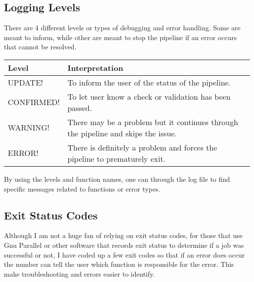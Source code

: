 \documentclass[letterpaper,10pt,english]{sphinxmanual}
\begin{document}
\subsection{Logging Levels}
\label{\detokenize{parsingStdErrOut:logging-levels}}
There are 4 different levels or types of debugging and error handling.  Some are meant to inform, while other are meant to stop the pipeline if an error occurs that cannot be resolved.


\begin{savenotes}\sphinxattablestart
\centering
\begin{tabulary}{\linewidth}[t]{|T|T|}
\hline
\sphinxstyletheadfamily 
Level
&\sphinxstyletheadfamily 
Interpretation
\\
\hline
UPDATE!
&
To inform the user of the status of the pipeline.
\\
\hline
CONFIRMED!
&
To let user know a check or validation has been passed.
\\
\hline
WARNING!
&
There may be a problem but it continues through the pipeline and skips the issue.
\\
\hline
ERROR!
&
There is definitely a problem and forces the pipeline to prematurely exit.
\\
\hline
\end{tabulary}
\par
\sphinxattableend\end{savenotes}

By using the levels and function names, one can  through the log file to find specific messages related to functions or error types.


\subsection{Exit Status Codes}
\label{\detokenize{parsingStdErrOut:exit-status-codes}}
Although I am not a huge fan of relying on exit status codes, for those that use Gnu Parallel or other software that records exit status to determine if a job was successful or not, I have coded up a few exit codes so that if an error does occur the number can tell the user which function is responsible for the error.  This make troubleshooting and errors easier to identify.
\end{document}
